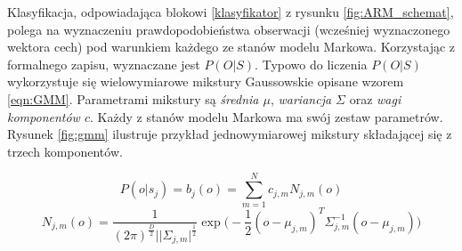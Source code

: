 \documentclass[a4paper,11pt,onecolumn,twoside,openright,titlepage]{article}
\newcommand{\refBlock}[1]{
	\hyperref[#1]{\ref*{#1}}
}
\begin{document}
		Klasyfikacja, odpowiadająca blokowi \refBlock{klasyfikator} z rysunku \ref{fig:ARM_schemat}, polega na wyznaczeniu prawdopodobieństwa obserwacji (wcześniej wyznaczonego wektora cech) pod warunkiem każdego ze stanów modelu Markowa. Korzystając z formalnego zapisu, wyznaczane jest $P(O|S)$. Typowo do liczenia $P(O|S)$ wykorzystuje się wielowymiarowe mikstury Gaussowskie opisane wzorem \ref{eqn:GMM}. Parametrami mikstury są \textit{średnia $\mu$}, \textit{wariancja $\Sigma$} oraz \textit{wagi komponentów $c$}. Każdy z stanów modelu Markowa ma swój zestaw parametrów. Rysunek \ref{fig:gmm} ilustruje przykład jednowymiarowej mikstury składającej się z trzech komponentów. 
	
		\begin{equation}
			P(o|s_j)=b_j(o) = \sum_{m=1}^N c_{j,m} N_{j,m}(o)
			\label{eqn:GMM}
		\end{equation}
		\begin{equation}
			N_{j,m}(o)=\frac{1}{(2\pi)^{\frac{D}{2}}||\Sigma_{j,m}|^{\frac{1}{2}}}\exp\bigg( -\frac{1}{2}(o-\mu_{j,m})^T\Sigma_{j,m}^{-1}(o-\mu_{j,m}) \bigg)
			\label{eqn:normal_distribution}
		\end{equation}	
	
\end{document}
